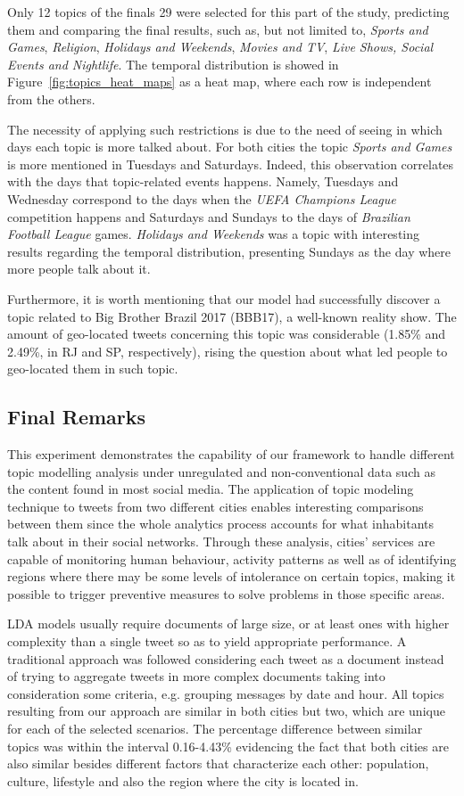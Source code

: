Only 12 topics of the finals 29 were selected for this part of the study, predicting them and comparing the final results, such as, but not limited to, \textit{Sports and Games}, \textit{Religion}, \textit{Holidays and Weekends}, \textit{Movies and TV}, \textit{Live Shows, Social Events and Nightlife}. The temporal distribution is showed in Figure~\ref{fig:topics_heat_maps} as a heat map, where each row is independent from the others.

The necessity of applying such restrictions is due to the need of seeing in which days each topic is more talked about. For both cities the topic \textit{Sports and Games} is more mentioned in Tuesdays and Saturdays. Indeed, this observation correlates with the days that topic-related events happens. Namely, Tuesdays and Wednesday correspond to the days when the \textit{UEFA Champions League} competition happens and Saturdays and Sundays to the days of \textit{Brazilian Football League} games. \textit{Holidays and Weekends} was a topic with interesting results regarding the temporal distribution, presenting Sundays as the day where more people talk about it. 

Furthermore, it is worth mentioning that our model had successfully discover a topic related to Big Brother Brazil 2017 (BBB17), a well-known reality show. The amount of geo-located tweets concerning this topic was considerable (1.85\% and 2.49\%, in RJ and SP, respectively), rising the question about what led people to geo-located them in such topic.

\subsection{Final Remarks}
This experiment demonstrates the capability of our framework to handle different topic modelling analysis under unregulated and non-conventional data such as the content found in most social media. The application of topic modeling technique to tweets from two different cities enables interesting comparisons between them since the whole analytics process accounts for what inhabitants talk about in their social networks. Through these analysis, cities' services are capable of monitoring human behaviour, activity patterns as well as of identifying regions where there may be some levels of intolerance on certain topics, making it possible to trigger preventive measures to solve problems in those specific areas.

LDA models usually require documents of large size, or at least ones with higher complexity than a single tweet so as to yield appropriate performance. A traditional approach was followed considering each tweet as a document instead of trying to aggregate tweets in more complex documents taking into consideration some criteria, e.g. grouping messages by date and hour. All topics resulting from our approach are similar in both cities but two, which are unique for each of the selected scenarios. The percentage difference between similar topics was within the interval 0.16-4.43\% evidencing the fact that both cities are also similar besides different factors that characterize each other: population, culture, lifestyle and also the region where the city is located in.

